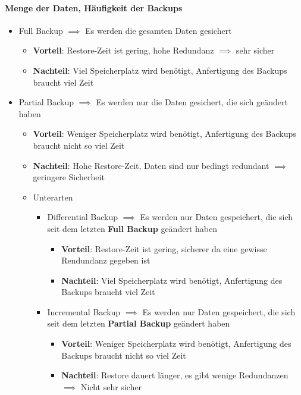 \paragraph{Menge der Daten, Häufigkeit der Backups}
\begin{itemize}
    \item Full Backup $\implies$ Es werden die gesamten Daten gesichert
    \begin{itemize}
        \item \textbf{Vorteil}: Restore-Zeit ist gering, hohe Redundanz $\implies$ sehr sicher
        \item \textbf{Nachteil}: Viel Speicherplatz wird benötigt, Anfertigung des Backups braucht viel Zeit
    \end{itemize}
    \item Partial Backup $\implies$ Es werden nur die Daten gesichert, die sich geändert haben
    \begin{itemize}
        \item \textbf{Vorteil}: Weniger Speicherplatz wird benötigt, Anfertigung des Backups braucht nicht so viel Zeit
        \item \textbf{Nachteil}: Hohe Restore-Zeit, Daten sind nur bedingt redundant $\implies$ geringere Sicherheit
        \item Unterarten
        \begin{itemize}
            \item Differential Backup $\implies$ Es werden nur Daten gespeichert, die sich seit dem letzten \textbf{Full Backup} geändert haben
            \begin{itemize}
                \item \textbf{Vorteil}: Restore-Zeit ist gering, sicherer da eine gewisse Rendundanz gegeben ist
                \item \textbf{Nachteil}: Viel Speicherplatz wird benötigt, Anfertigung des Backups braucht viel Zeit
            \end{itemize}
            \item Incremental Backup $\implies$ Es werden nur Daten gespeichert, die sich seit dem letzten \textbf{Partial Backup} geändert haben
            \begin{itemize}
                \item \textbf{Vorteil}: Weniger Speicherplatz wird benötigt, Anfertigung des Backups braucht nicht so viel Zeit
                \item \textbf{Nachteil}: Restore dauert länger, es gibt wenige Redundanzen $\implies$ Nicht sehr sicher
            \end{itemize}
        \end{itemize}
    \end{itemize}
\end{itemize}

